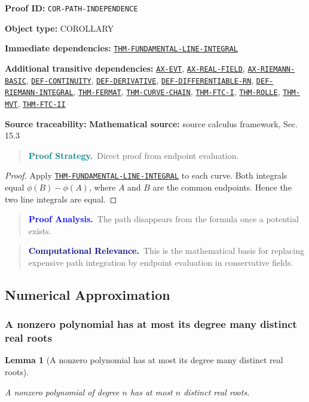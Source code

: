 \documentclass[10pt]{article}
\newcommand{\pidraw}[1]{\begingroup\urlstyle{tt}\nolinkurl{#1}\endgroup}
\newcommand{\pidref}[1]{\hyperref[prf:#1]{\pidraw{#1}}}
\newcommand{\pid}[1]{\pidref{#1}}
\newtheorem{lemma}[theorem]{Lemma}
\theoremstyle{definition}
\theoremstyle{remark}
\newenvironment{proofstrategy}
{\begin{quote}\small\noindent\textbf{\textcolor{teal}{Proof Strategy.}}\ }
{\end{quote}}
\newenvironment{proofanalysis}
{\begin{quote}\small\noindent\textbf{\textcolor{blue}{Proof Analysis.}}\ }
{\end{quote}}
\newenvironment{computationalrelevance}
{\begin{quote}\small\noindent\textbf{\textcolor{navy}{Computational Relevance.}}\ }
{\end{quote}}
\newcommand{\meta}[2]{\noindent\textbf{#1:} #2\par}
\begin{document}
\meta{Proof ID}{\pidraw{COR-PATH-INDEPENDENCE}}
\meta{Object type}{COROLLARY}
\meta{Immediate dependencies}{\pidref{THM-FUNDAMENTAL-LINE-INTEGRAL}}
\meta{Additional transitive dependencies}{\pidref{AX-EVT}, \pidref{AX-REAL-FIELD}, \pidref{AX-RIEMANN-BASIC}, \pidref{DEF-CONTINUITY}, \pidref{DEF-DERIVATIVE}, \pidref{DEF-DIFFERENTIABLE-RN}, \pidref{DEF-RIEMANN-INTEGRAL}, \pidref{THM-FERMAT}, \pidref{THM-CURVE-CHAIN}, \pidref{THM-FTC-I}, \pidref{THM-ROLLE}, \pidref{THM-MVT}, \pidref{THM-FTC-II}}
\meta{Source traceability}{\textbf{Mathematical source:} source calculus framework, Sec. 15.3}

\begin{proofstrategy}Direct proof from endpoint evaluation.\end{proofstrategy}

\begin{proof}

Apply \pid{THM-FUNDAMENTAL-LINE-INTEGRAL} to each curve. Both integrals equal
$\phi(B)-\phi(A)$, where $A$ and $B$ are the common endpoints. Hence the two
line integrals are equal.

\end{proof}

\begin{proofanalysis}The path disappears from the formula once a potential exists.\end{proofanalysis}

\begin{computationalrelevance}This is the mathematical basis for replacing expensive path integration by endpoint evaluation in conservative fields.\end{computationalrelevance}

\subsection{Numerical Approximation}

\subsubsection{A nonzero polynomial has at most its degree many distinct real roots}

\begin{lemma}[A nonzero polynomial has at most its degree many distinct real roots]\label{prf:LEM-POLYNOMIAL-ROOT-COUNT}

A nonzero polynomial of degree $n$ has at most $n$ distinct real roots.

\end{lemma}
\end{document}
